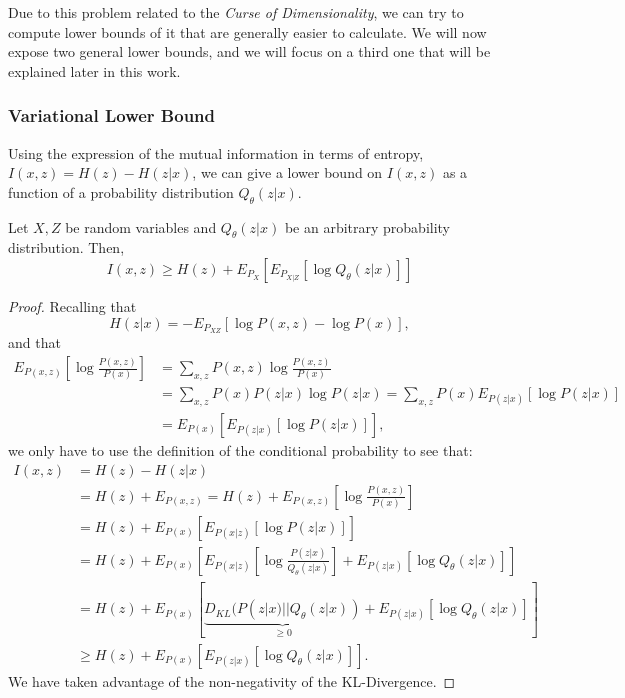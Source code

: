 Due to this problem related to the \emph{Curse of Dimensionality}, we can try to compute lower bounds of it that are generally easier to calculate. We will now expose two general lower bounds, and we will focus on a third one that will be explained later in this work.

\subsubsection{Variational Lower Bound}



Using the expression of the mutual information in terms of entropy, $I(x,z) = H(z) - H(z|x)$, we can give a lower bound on $I(x,z)$ as a function of a probability distribution $Q_\theta(z|x)$. 

\begin{nprop}
Let $X,Z$ be random variables and $Q_\theta(z|x)$ be an arbitrary probability distribution. Then,
$$
I(x,z) \geq H(z) + E_{P_X} \left[ E_{P_{X|Z}}\left[\log Q_\theta(z|x)\right]\right] 
$$
\end{nprop}

\begin{proof}
Recalling that
$$
H(z|x) = - E_{P_{XZ}} \left[ \log P(x,z) - \log P(x)\right],
$$
and that
\begin{align*}
E_{P(x,z)}\left[\log\frac{P(x,z)}{P(x)}\right] & =  \sum_{x,z} P(x,z) \log\frac{P(x,z)}{P(x)} \\ 
& = \sum_{x,z} P(x)P(z|x) \log P(z|x) = \sum_{x,z} P(x) E_{P(z|x)}[\log P(z|x)]\\
 & =  E_{P(x)}\left[E_{P(z|x)}[\log P(z|x)]\right],
\end{align*}
we only have to use the definition of the conditional probability to see that:
\begin{align*}
I(x,z) & =  H(z) - H(z|x) \\
    & =  H(z) + E_{P(x,z)} = H(z) + E_{P(x,z)} \left[ \log \frac{P(x,z)}{P(x)}\right] \\
    & =  H(z) + E_{P(x)} \left[ E_{P(x|z)}\left[\log P(z|x)\right]\right] \\
    & = H(z) + E_{P(x)} \left[ E_{P(x|z)} \left[\log \frac{P(z|x)}{Q_\theta(z|x)}\right] + E_{P(z|x)}\left[\log Q_\theta(z|x)\right]\right] \\
    & =  H(z) + E_{P(x)}\left[ \underbrace{D_{KL}(P(z|x)||Q_\theta(z|x))}_{\geq 0} + E_{P(z|x)}\left[\log Q_\theta(z|x)\right] \right]\\
    & \geq H(z) + E_{P(x)}\left[E_{P(z|x)}\left[ \log Q_\theta(z|x)\right]\right].
\end{align*}
We have taken advantage of the non-negativity of the KL-Divergence.
\end{proof}

